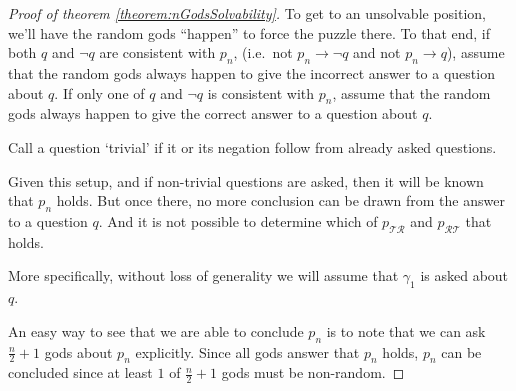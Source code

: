 \documentclass[twoside,twocolumn,a4paper,11pt]{article}
\theoremstyle{definition}
\begin{document}
\begin{proof}[Proof of theorem \ref{theorem:nGodsSolvability}]
To get to an unsolvable position, we'll have the random gods ``happen''
to force the puzzle there. To that end,
if both $q$ and $\neg q$ are consistent with $p_n$,
(i.e.\ not $p_n\!\rightarrow\!\neg q$ and not $p_n\!\rightarrow\!q$),
assume that the random gods always happen to give the incorrect answer
to a question about $q$.
If only one of $q$ and $\neg q$ is consistent with $p_n$,
assume that the random gods always happen to give the correct answer 
to a question about $q$.


Call a question `trivial' if it or its negation follow from already
asked questions.

Given this setup,
and if non-trivial questions are asked,
then it will be known that $p_n$ holds.
But once there,
no more conclusion can be drawn from the answer to a question $q$.
And it is not possible to determine which of 
$p_{\mathcal{\scriptscriptstyle T}\mathcal{\scriptscriptstyle R}}$ and
$p_{\mathcal{\scriptscriptstyle R}\mathcal{\scriptscriptstyle T}}$
that holds.

More specifically, without loss of generality we will assume that $\gamma_1$ is asked about $q$. 


An easy way to see that we 
are able to
conclude $p_n$ is to note that we can ask
$\frac{n}{2}+1$ gods
about $p_n$ explicitly.
Since all gods answer that $p_n$ holds, $p_n$ can be concluded since at least
$1$ of $\frac{n}{2}+1$ gods must be non-random.


\end{proof}
\end{document}
